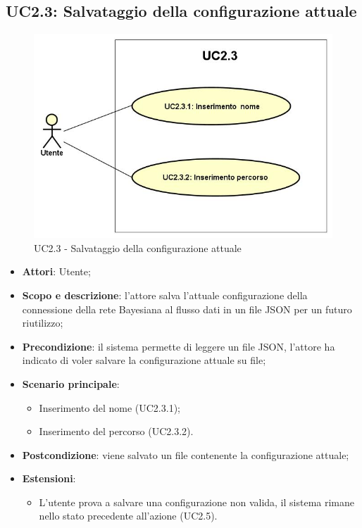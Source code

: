 \subsection{UC2.3: Salvataggio della configurazione attuale}
\hypertarget{UC2.3}{}
\begin{figure} [H]
	\centering
	\includegraphics[scale=0.5]{Img/UC2-3}
	\caption{UC2.3 - Salvataggio della configurazione attuale}\label{}
\end{figure}
\begin{itemize}
	\item \textbf{Attori}: Utente;
	\item \textbf{Scopo e descrizione}: l'attore salva l'attuale configurazione della connessione della rete Bayesiana al flusso dati in un file JSON per un futuro riutilizzo;
	\item \textbf{Precondizione}: il sistema permette di leggere un file JSON, l'attore ha indicato di voler salvare la configurazione attuale su file;
	\item \textbf{Scenario principale}:
	\begin{itemize}
		\item Inserimento del nome (UC2.3.1);
		\item Inserimento del percorso (UC2.3.2).
	\end{itemize}
	\item \textbf{Postcondizione}: viene salvato un file contenente la configurazione attuale;
	\item \textbf{Estensioni}:
	\begin{itemize}
		\item L'utente prova a salvare una configurazione non valida, il sistema rimane nello stato precedente all'azione (UC2.5).
	\end{itemize}
\end{itemize}

